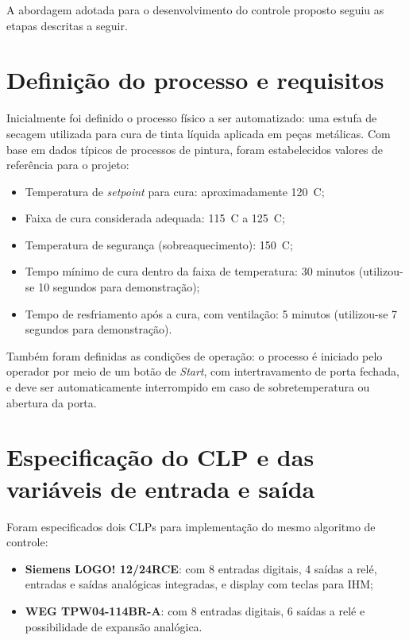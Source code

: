 \documentclass[
  12pt,
  openright,
  oneside,
  a4paper,
  chapter=TITLE,
  section=TITLE,
  brazilian
]{abntex2}
\begin{document}
A abordagem adotada para o desenvolvimento do controle proposto seguiu as etapas descritas a seguir.

\section{Defini\c{c}\~{a}o do processo e requisitos}

Inicialmente foi definido o processo f\'{i}sico a ser automatizado: uma estufa de secagem utilizada para cura de tinta l\'{i}quida aplicada em pe\c{c}as met\'{a}licas. Com base em dados t\'{i}picos de processos de pintura, foram estabelecidos valores de refer\^{e}ncia para o projeto:

\begin{itemize}
    \item Temperatura de \textit{setpoint} para cura: aproximadamente 120~\textdegree{}C;
    \item Faixa de cura considerada adequada: 115~\textdegree{}C a 125~\textdegree{}C;
    \item Temperatura de seguran\c{c}a (sobreaquecimento): 150~\textdegree{}C;
    \item Tempo m\'{i}nimo de cura dentro da faixa de temperatura: 30 minutos (utilizou-se 10 segundos para demonstra\c{c}\~{a}o);
    \item Tempo de resfriamento ap\'{o}s a cura, com ventila\c{c}\~{a}o: 5 minutos (utilizou-se 7 segundos para demonstra\c{c}\~{a}o).
\end{itemize}

Tamb\'{e}m foram definidas as condi\c{c}\~{o}es de opera\c{c}\~{a}o: o processo \'{e} iniciado pelo operador por meio de um bot\~{a}o de \textit{Start}, com intertravamento de porta fechada, e deve ser automaticamente interrompido em caso de sobretemperatura ou abertura da porta.

\section{Especifica\c{c}\~{a}o do CLP e das vari\'{a}veis de entrada e sa\'{i}da}

Foram especificados dois CLPs para implementa\c{c}\~{a}o do mesmo algoritmo de controle:
\begin{itemize}
    \item \textbf{Siemens LOGO! 12/24RCE}: com 8 entradas digitais, 4 sa\'{i}das a rel\'{e}, entradas e sa\'{i}das anal\'{o}gicas integradas, e display com teclas para IHM;
    \item \textbf{WEG TPW04-114BR-A}: com 8 entradas digitais, 6 sa\'{i}das a rel\'{e} e possibilidade de expans\~{a}o anal\'{o}gica.
\end{itemize}
\end{document}
